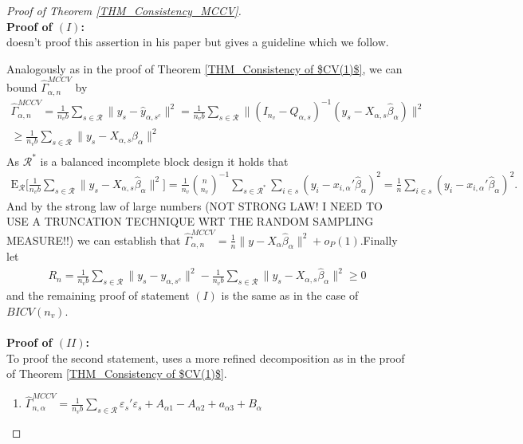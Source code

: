 \documentclass[Research_Module_ES.tex]{subfiles}
\begin{document}
\begin{proof}[Proof of Theorem \ref{THM_Consistency_MCCV}]~\\
	\textbf{Proof of $(I)$:} \\
	\cite{shao} doesn't proof this assertion in his paper but gives a guideline which we follow.
	
	Analogously as in the proof of Theorem \ref{THM_Consistency of $CV(1)$}, we can bound $\hat{\Gamma}_{\alpha,n}^{MCCV}$ by
	\begin{align*}
	\hat{\Gamma}_{\alpha,n}^{MCCV}= \frac{1}{n_vb}\sum_{s\in \mathcal{R}}\lVert y_s-\hat{y}_{\alpha,s^c}\rVert^2
	= \frac{1}{n_vb}\sum_{s\in \mathcal{R}}\lVert (I_{n_v}-Q_{\alpha,s})^{-1}(y_s-X_{\alpha,s}\hat{\beta}_\alpha)\rVert^2\\
	\ge \frac{1}{n_vb}\sum_{s\in \mathcal{R}}\lVert y_s-X_{\alpha,s}\hat{\beta}_\alpha\rVert^2\\
	\end{align*}
	As $\mathcal{R}^\ast$ is a balanced incomplete block design it holds that
	\begin{align*}
	\mathrm{E}_\mathcal{R} \biggl[\frac{1}{n_vb}\sum_{s\in \mathcal{R}}\lVert y_s-X_{\alpha,s}\hat{\beta}_\alpha\rVert^2 \biggr] 
	= \frac{1}{n_v}\binom{n}{n_v}^{-1}\sum_{s\in \mathcal{R}^\ast}\sum_{i\in s}(y_i-x_{i,\alpha}'\hat{\beta}_\alpha)^2
	= \frac{1}{n}\sum_{i\in s}(y_i-x_{i,\alpha}'\hat{\beta}_\alpha)^2.
	\end{align*}
	And by the strong law of large numbers (NOT STRONG LAW! I NEED TO USE A TRUNCATION TECHNIQUE WRT THE RANDOM SAMPLING MEASURE!!)
	we can establish that $\hat{\Gamma}_{\alpha,n}^{MCCV} = \frac{1}{n}\lVert y-X_{\alpha}\hat{\beta}_\alpha\rVert^2 + o_P(1)$.Finally let
	\begin{align*}
	R_n= \frac{1}{n_vb}\sum_{s\in \mathcal{R}}\lVert y_s-\hat{y}_{\alpha,s^c}\rVert^2- \frac{1}{n_vb}\sum_{s\in \mathcal{R}}\lVert y_s-X_{\alpha,s}\hat{\beta}_\alpha\rVert^2 \ge 0
	\end{align*} 
	and the remaining proof of statement $(I)$ is the same as in the case of $BICV(n_v)$.\\\\
	\textbf{Proof of $(II)$:}\\
	To proof the second statement, \cite{shao} uses a more refined decomposition as in the proof of Theorem \ref{THM_Consistency of $CV(1)$}. 
	\begin{enumerate}
		\item  $\hat{\Gamma}_{n,\alpha}^{MCCV} = \frac{1}{n_vb}\sum_{s\in \mathcal{R}}\varepsilon_s'\varepsilon_s+ A_{\alpha1}-A_{\alpha2}+a_{\alpha3}+B_\alpha$

\end{enumerate}
\end{proof}
\end{document}
